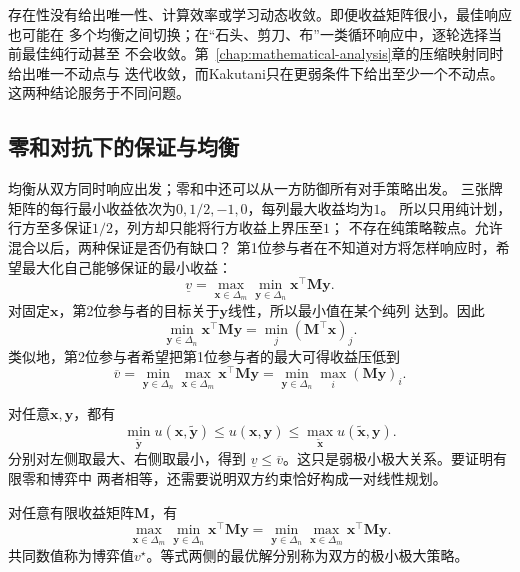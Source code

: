 存在性没有给出唯一性、计算效率或学习动态收敛。即便收益矩阵很小，最佳响应也可能在
多个均衡之间切换；在“石头、剪刀、布”一类循环响应中，逐轮选择当前最佳纯行动甚至
不会收敛。第~\ref{chap:mathematical-analysis}章的压缩映射同时给出唯一不动点与
迭代收敛，而Kakutani只在更弱条件下给出至少一个不动点。这两种结论服务于不同问题。

\subsection{零和对抗下的保证与均衡}
\label{sec:game-matrix-zero-sum-duality}

均衡从双方同时响应出发；零和中还可以从一方防御所有对手策略出发。
三张牌矩阵的每行最小收益依次为\(0,1/2,-1,0\)，每列最大收益均为\(1\)。
所以只用纯计划，行方至多保证\(1/2\)，列方却只能将行方收益上界压至\(1\)；
不存在纯策略鞍点。允许混合以后，两种保证是否仍有缺口？
第1位参与者在不知道对方将怎样响应时，希望最大化自己能够保证的最小收益：
\[
  \underline v
  =
  \max_{\bm{x}\in\Delta_m}
  \min_{\bm{y}\in\Delta_n}
  \bm{x}^{\top}\bm{M}\bm{y}.
\]
对固定\(\bm{x}\)，第2位参与者的目标关于\(\bm{y}\)线性，所以最小值在某个纯列
达到。因此
\[
  \min_{\bm{y}\in\Delta_n}
  \bm{x}^{\top}\bm{M}\bm{y}
  =
  \min_j(\bm{M}^{\top}\bm{x})_j.
\]
类似地，第2位参与者希望把第1位参与者的最大可得收益压低到
\[
  \overline v
  =
  \min_{\bm{y}\in\Delta_n}
  \max_{\bm{x}\in\Delta_m}
  \bm{x}^{\top}\bm{M}\bm{y}
  =
  \min_{\bm{y}\in\Delta_n}\max_i(\bm{M}\bm{y})_i.
\]

对任意\(\bm{x},\bm{y}\)，都有
\[
  \min_{\widetilde{\bm{y}}}
  u(\bm{x},\widetilde{\bm{y}})
  \leq
  u(\bm{x},\bm{y})
  \leq
  \max_{\widetilde{\bm{x}}}
  u(\widetilde{\bm{x}},\bm{y}).
\]
分别对左侧取最大、右侧取最小，得到
\(\underline v\leq\overline v\)。这只是弱极小极大关系。要证明有限零和博弈中
两者相等，还需要说明双方约束恰好构成一对线性规划。

\begin{theorem}[有限零和博弈的极小极大定理]
\label{thm:game-finite-minimax}
对任意有限收益矩阵\(\bm{M}\)，有
\begin{equation}
  \max_{\bm{x}\in\Delta_m}
  \min_{\bm{y}\in\Delta_n}
  \bm{x}^{\top}\bm{M}\bm{y}
  =
  \min_{\bm{y}\in\Delta_n}
  \max_{\bm{x}\in\Delta_m}
  \bm{x}^{\top}\bm{M}\bm{y}.
  \label{eq:game-minimax-equality}
\end{equation}
共同数值称为博弈值\(v^\star\)。等式两侧的最优解分别称为双方的极小极大策略。
\end{theorem}

